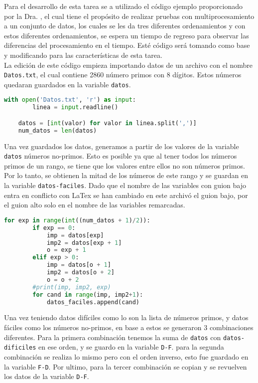 \documentclass{article}
\begin{document}
Para el desarrollo de esta tarea se a utilizado el código ejemplo proporcionado por la Dra. \citet{DRA.Code} , el cual tiene el propósito de realizar pruebas con multiprocesamiento a un conjunto de datos, los cuales se les da tres diferentes ordenamientos y con estos diferentes ordenamientos, se espera un tiempo de regreso para observar las diferencias del procesamiento en el tiempo. Esté código será  tomando como base y modificando para las características de esta tarea.\\

La edición de este código  empieza importando datos de un archivo con el nombre \texttt{Datos.txt}, el cual contiene 2860 número primos con 8 dígitos. Estos números quedaran guardados en la variable \texttt{datos}.\\

\begin{lstlisting}[language=Python]
with open('Datos.txt', 'r') as input:
        linea = input.readline()

    datos = [int(valor) for valor in linea.split(',')]
    num_datos = len(datos)
\end{lstlisting}

Una vez guardados los datos, generamos a partir de los valores de la variable \texttt{datos} números no-primos. Esto es posible ya que al tener todos los números primos de un rango, se tiene que los valores entre ellos no son números primos. Por lo tanto, se obtienen la mitad de los números de este rango y se guardan en la variable \texttt{datos-faciles}. Dado que el nombre de las variables con guion bajo entra en conflicto con LaTex se han cambiado en este archivó   el guion bajo, por el guion alto solo en el nombre de las variables remarcadas.\\ 

\begin{lstlisting}[language=Python]
for exp in range(int((num_datos + 1)/2)):
        if exp == 0:
            imp = datos[exp]
            imp2 = datos[exp + 1]
            o = exp + 1
        elif exp > 0:
            imp = datos[o + 1]
            imp2 = datos[o + 2]
            o = o + 2
        #print(imp, imp2, exp)
        for cand in range(imp, imp2+1):
            datos_faciles.append(cand)
\end{lstlisting}

Una vez teniendo datos difíciles como lo son la lista de números  primos, y
datos fáciles como los números no-primos, en base a estos se generaron 
3 combinaciones diferentes. Para la primera combinación tenemos la 
suma de \texttt{datos} con  \texttt{datos-dificiles} en ese orden, y se guardo
en la variable \texttt{D-F}. para la segunda combinación se realiza lo 
mismo pero con el orden inverso, esto fue guardado en la variable
\texttt{F-D}. Por ultimo, para la tercer combinación se copian y se  
revuelven los datos de la variable \texttt{D-F}.\\
\end{document}
